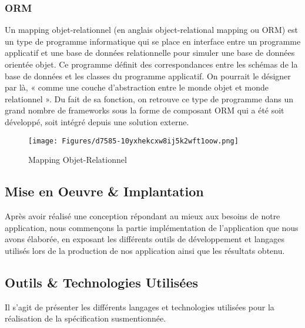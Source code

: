 \vspace{.5cm}
\subsection{ORM}
\vspace{.5cm}

Un mapping objet-relationnel (en anglais object-relational mapping ou ORM) est un type de programme informatique qui se place en interface entre un programme applicatif et une base de données relationnelle pour simuler une base de données orientée objet. Ce programme définit des correspondances entre les schémas de la base de données et les classes du programme applicatif. On pourrait le désigner par là, « comme une couche d’abstraction entre le monde objet et monde relationnel ». Du fait de sa fonction, on retrouve ce type de programme dans un grand nombre de frameworks sous la forme de composant ORM qui a été soit développé, soit intégré depuis une solution externe.
\vspace{.4cm}

\begin{figure}[H]
    \centering
    \texttt{[image: Figures/d7585-10yxhekcxw8ij5k2wft1oow.png]}
    \caption{Mapping Objet-Relationnel}
\end{figure}



\begin{center}
\chapter{Mise en Oeuvre \& Implantation}
\end{center}

Après avoir réalisé une conception répondant au mieux aux besoins de notre application, nous commençons la partie implémentation de l’application que nous avons élaborée, en exposant les différents outils de développement et langages utilisés lors de la production de nos application ainsi que les résultats obtenu.

\vspace{1cm}
\section{Outils \& Technologies Utilisées}
\vspace{.5cm}

Il s'agit de présenter les différents langages et technologies utilisées pour la réalisation de la spécification susmentionnée.

